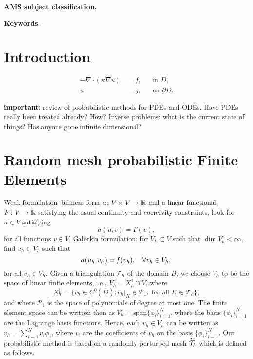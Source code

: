 \documentclass[10pt]{article}
\begin{document}
\maketitle	

\begin{abstract} 
\end{abstract}

\textbf{AMS subject classification.}

\textbf{Keywords.}

\section{Introduction}

\todo \cite{AbG18, KeH16, KSH18, CCC16, CGS17}

\begin{equation}\label{eq:ellipticEquation}
\begin{aligned}
	-\nabla \cdot (\kappa \nabla u) &= f, &&\text{in } D,\\
	u &= g, &&\text{on } \partial D.
\end{aligned}
\end{equation}

\textbf{important:} review of probabilistic methods for PDEs and ODEs. Have PDEs really been treated already? How? Inverse problems: what is the current state of things? Has anyone gone infinite dimensional?

\section{Random mesh probabilistic Finite Elements} 

Weak formulation: bilinear form $a\colon V\times V \to \mathbb{R}$ and a linear functional $F\colon V \to \mathbb{R}$ satisfying the usual continuity and coercivity constraints, look for $u \in V$ satisfying
\begin{equation}
	a(u, v) = F(v),	
\end{equation}
for all functions $v \in V$. Galerkin formulation: for $V_h \subset V$ such that $\dim V_h < \infty$, find $u_h \in V_h$ such that
\begin{equation}
	a(u_h, v_h) = f(v_h), \quad \forall v_h \in V_h,\\
\end{equation}
for all $v_h \in V_h$. Given a triangulation $\mathcal T_h$ of the domain $D$, we choose $V_h$ to be the space of linear finite elements, i.e., $V_h = X_h^1 \cap V$, where 
\begin{equation}
	X_h^1 = \{v_h \in C^0(\overline D) \colon v_h|_{K} \in \mathcal P_1, \; \text{for all } K \in \mathcal T_h\},
\end{equation}
and where $\mathcal P_1$ is the space of polynomials of degree at most one. The finite element space can be written then as $V_h = \mathrm{span}\{\phi_i\}_{i=1}^N$, where the basis $\{\phi_i\}_{i=1}^N$ are the Lagrange basis functions. Hence, each $v_h \in V_h$ can be written as $v_h = \sum_{i=1}^N v_i \phi_i$, where $v_i$ are the coefficients of $v_h$ on the basis $\{\phi_i\}_{i=1}^N$. Our probabilistic method is based on a randomly perturbed mesh $\widetilde {\mathcal T}_h$ which is defined as follows.
\end{document}
